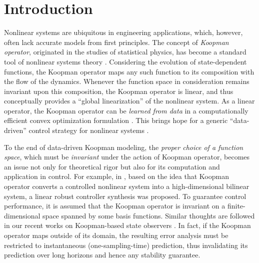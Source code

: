 \documentclass[english]{cccconf}
\renewcommand{\emph}[1]{\textit{#1}}
\begin{document}
\section{Introduction}
\par Nonlinear systems are ubiquitous in engineering applications, which, however, often lack accurate models from first principles. The concept of \emph{Koopman operator}, originated in the studies of statistical physics, has become a standard tool of nonlinear systems theory \cite{mauroy2020koopman}.  
Considering the evolution of state-dependent functions, the Koopman operator maps any such function to its composition with the flow of the dynamics. Whenever the function space in consideration remains invariant upon this composition, the Koopman operator is linear, and thus conceptually provides a ``global linearization'' of the nonlinear system. 
As a linear operator, the Koopman operator can be \emph{learned from data} in a computationally efficient convex optimization formulation \cite{william2015data, klus2020eigendecompositions, kostic2022learning}. This brings hope for a generic ``data-driven'' control strategy for nonlinear systems \cite{tang2022data}. 

\par To the end of data-driven Koopman modeling, the \emph{proper choice of a function space}, which must be \emph{invariant} under the action of Koopman operator, becomes an issue not only for theoretical rigor but also for its computation and application in control. 
For example, in \cite{strasser2025koopman}, based on the idea that Koopman operator converts a controlled nonlinear system into a high-dimensional bilinear system, a linear robust controller synthesis was proposed. To guarantee control performance, it is assumed that the Koopman operator is invariant on a finite-dimensional space spanned by some basis functions. Similar thoughts are followed in our recent works on Koopman-based state observers \cite{ye2025edmd, ni2025data}. 
In fact, if the Koopman operator maps outside of its domain, the resulting error analysis must be restricted to instantaneous (one-sampling-time) prediction, thus invalidating its prediction over long horizons \cite{philipp2025error} and hence any stability guarantee. 
\end{document}
